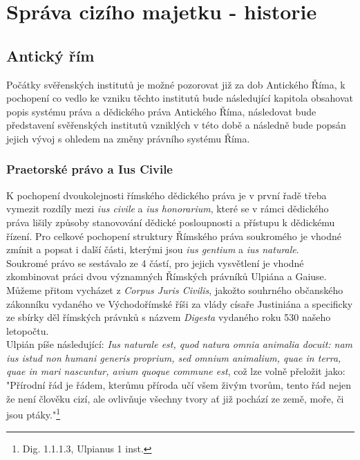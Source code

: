\documentclass{article}
\begin{document}
\newpage

\section{Správa cizího majetku - historie}
\subsection{Antický řím}

Počátky svěřenských institutů je možné pozorovat již za dob Antického Říma, k pochopení co vedlo ke vzniku těchto institutů bude následující kapitola obsahovat popis systému práva a dědického práva Antického Říma, následovat bude představení svěřenských institutů vzniklých v této době a následně bude popsán jejich vývoj s ohledem na změny právního systému Říma.

\subsubsection{Praetorské právo a Ius Civile}

K pochopení dvoukolejnosti římského dědického práva je v první řadě třeba vymezit rozdíly mezi \textit{ius civile} a \textit{ius honorarium}, které se v rámci dědického práva lišily způsoby stanovování dědické posloupnosti a přístupu k dědickému řízení. Pro celkové pochopení struktury Římského práva soukromého je vhodné zmínit a popsat i další části, kterými jsou \textit{ius gentium} a \textit{ius naturale}. \\

Soukromé právo se sestávalo ze 4 částí, pro jejich vysvětlení je vhodné zkombinovat práci dvou významných Římských právníků Ulpiána a Gaiuse. Můžeme přitom vycházet z \textit{Corpus Juris Civilis}, jakožto souhrného občanského zákonníku vydaného ve Východořímské říši za vlády císaře Justiniána a specificky ze sbírky děl římských právnků s názvem \textit{Digesta} vydaného roku 530 našeho letopočtu. \\

Ulpián píše následující: \textit{Ius naturale est, quod natura omnia animalia docuit: nam ius istud non humani generis proprium, sed omnium animalium, quae in terra, quae in mari nascuntur, avium quoque commune est}, což lze volně přeložit jako: "Přírodní řád je řádem, kterůmu příroda učí všem živým tvorům, tento řád nejen že není člověku cizí, ale ovlivňuje všechny tvory ať již pochází ze země, moře, či jsou ptáky."\footnote{Dig. 1.1.1.3, Ulpianus 1 inst.} \\
\end{document}
